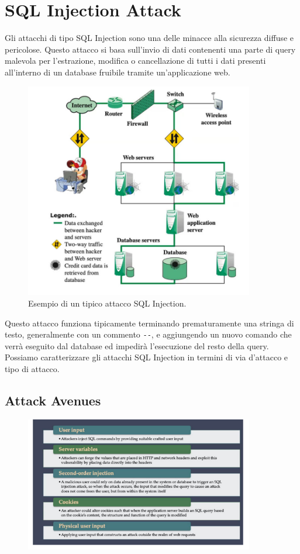 \section{SQL Injection Attack}

Gli attacchi di tipo SQL Injection sono una delle minacce alla sicurezza diffuse
e pericolose. Questo attacco si basa sull'invio di dati contenenti una
parte di query malevola per l'estrazione, modifica o cancellazione di tutti i
dati presenti all'interno di un database fruibile tramite un'applicazione web.

\begin{figure}[H]
    \centering
    \includegraphics[width=10cm, keepaspectratio]{capitoli/sql_security/imgs/sql1.png}
    \caption{Esempio di un tipico attacco SQL Injection.}
\end{figure}

Questo attacco funziona tipicamente terminando prematuramente una stringa di
testo, generalmente con un commento \verb|--|, e aggiungendo un nuovo comando
che verrà eseguito dal database ed impedirà l'esecuzione del resto della query.\\

Possiamo caratterizzare gli attacchi SQL Injection in termini di via d'attacco e
tipo di attacco.

\subsection{Attack Avenues}

\begin{figure}[H]
    \centering
    \includegraphics[width=10cm, keepaspectratio]{capitoli/sql_security/imgs/sql3.png}
\end{figure}

